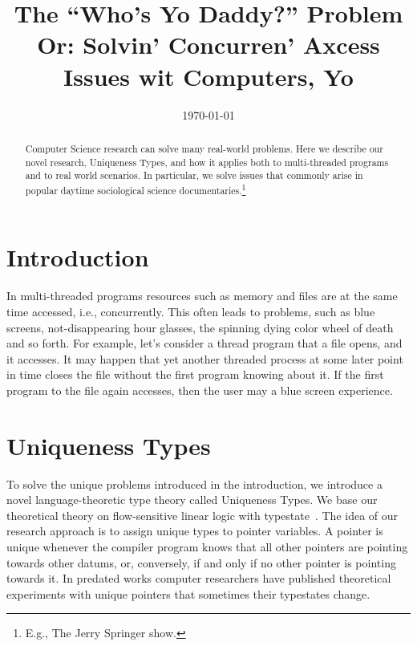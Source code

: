 \documentclass[preprint,10pt]{sigplanconf}
\begin{document}
\title{The ``Who's Yo Daddy?'' Problem \\ \Large{Or: Solvin' Concurren' Axcess Issues wit Computers, Yo}}

           {}
           {}
           {}
           {}          
\date{\today}

\maketitle

\pagestyle{empty}
\thispagestyle{empty}

\begin{abstract}
Computer Science research can solve many real-world problems. Here we describe our novel research, Uniqueness Types, and how it applies both to multi-threaded programs and to real world scenarios. In particular, we solve issues that commonly arise in popular daytime sociological science documentaries.\footnote{E.g., The Jerry Springer show.}
\end{abstract}

\section{Introduction}
In multi-threaded programs resources such as memory and files are at the same time accessed, i.e., concurrently. This often leads to problems, such as blue screens, not-disappearing hour glasses, the spinning dying color wheel of death and so forth. For example, let's consider a thread program that a file opens, and it accesses. It may happen that yet another threaded process at some later point in time closes the file without the first program knowing about it. If the first program to the file again accesses, then the user may a blue screen experience.

\section{Uniqueness Types}
To solve the unique problems introduced in the introduction, we introduce a novel language-theoretic type theory called Uniqueness Types. We base our theoretical theory on flow-sensitive linear logic with typestate~\cite{CMUwork}. The idea of our research approach is to assign unique types to pointer variables. A pointer is unique whenever the compiler program knows that all other pointers are pointing towards other datums, or, conversely, if and only if no other pointer is pointing towards it. In predated works computer researchers have published theoretical experiments with unique pointers that sometimes their typestates change.
\end{document}
